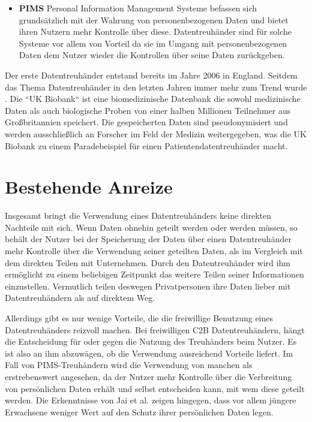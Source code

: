 \documentclass{scrreprt}
\begin{document}
\begin{itemize}
    \item \textbf{PIMS} Personal Information Management Systeme befassen sich grundsätzlich mit der Wahrung von personenbezogenen Daten und bietet ihren Nutzern mehr Kontrolle über diese.  Datentreuhänder sind für solche Systeme vor allem von Vorteil da sie im Umgang mit personenbezogenen Daten dem Nutzer wieder die Kontrollen über seine Daten zurückgeben.
\end{itemize}

Der erste Datentreuhänder entstand bereits im Jahre 2006 in England. Seitdem das Thema Datentreuhänder in den letzten Jahren immer mehr zum Trend wurde \cite{dt-richter2020ddvtalk}. Die ``UK Biobank`` ist eine biomedizinische Datenbank die sowohl medizinische Daten als auch biologische Proben von einer halben Millionen Teilnehmer aus Großbritannien speichert\cite{dt-hardinges2018data}. Die gespeicherten Daten sind pseudonymisiert und werden ausschließlich an Forscher im Feld der Medizin weitergegeben, was die UK Biobank zu einem Paradebeispiel für einen Patientendatentreuhänder macht.


\section{Bestehende Anreize}
Insgesamt bringt die Verwendung eines Datentreuhänders keine direkten Nachteile mit sich. Wenn Daten ohnehin geteilt werden oder werden müssen, so behält der Nutzer bei der Speicherung der Daten über einen Datentreuhänder mehr Kontrolle über die Verwendung seiner geteilten Daten, als im Vergleich mit dem direkten Teilen mit Unternehmen. Durch den Datentreuhänder wird ihm ermöglicht zu einem beliebigen Zeitpunkt das weitere Teilen seiner Informationen einzustellen. Vermutlich teilen deswegen Privatpersonen ihre Daten lieber mit Datentreuhändern als auf direktem Weg. \cite{dt-tresor24study}

Allerdings gibt es nur wenige Vorteile, die die freiwillige Benutzung eines Datentreuhänders reizvoll machen. Bei freiwilligen C2B Datentreuhändern, hängt die Entscheidung für oder gegen die Nutzung des Treuhänders beim Nutzer. Es ist also an ihm abzuwägen, ob die Verwendung ausreichend Vorteile liefert. Im Fall von PIMS-Treuhändern wird die Verwendung von manchen als erstrebenswert angesehen, da der Nutzer mehr Kontrolle über die Verbreitung von persönlichen Daten erhält und selbst entscheiden kann, mit wem diese geteilt werden. Die Erkenntnisse von Jai et al. \cite{dt-jai2016privacy} zeigen hingegen, dass vor allem jüngere Erwachsene weniger Wert auf den Schutz ihrer persönlichen Daten legen.
\end{document}
